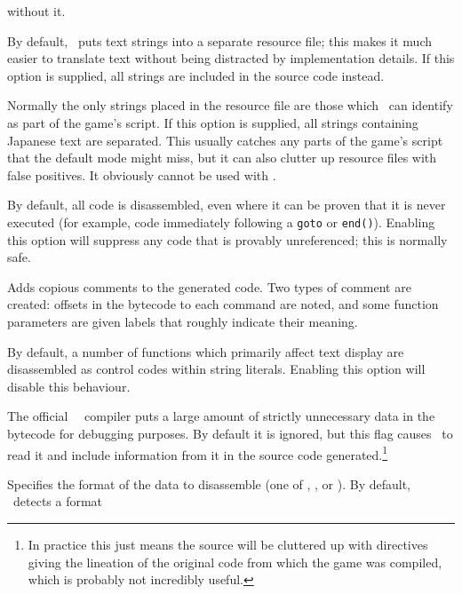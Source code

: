 \begin{nicelist}
\begin{extraopts}
      without it.
    \item[\clboth{s}{single-file}]
      By default, \archiver\ puts text strings into a separate resource file; this
      makes it much easier to translate text without being distracted by
      implementation details.  If this option is supplied, all strings are
      included in the source code instead.
    \item[\clboth{S}{separate-all}]
      Normally the only strings placed in the resource file are those which
      \archiver\ can identify as part of the game's script.  If this option is
      supplied, all strings containing Japanese text are separated.  This
      usually catches any parts of the game's script that the default mode might
      miss, but it can also clutter up resource files with false positives.  It
      obviously cannot be used with .
    \item[\clboth{u}{unreferenced}]
      By default, all code is disassembled, even where it can be proven that it
      is never executed (for example, code immediately following a
      \lstinline|goto| or \lstinline|end()|).  Enabling this option will
      suppress any code that is provably unreferenced; this is normally safe.
    \item[\clboth{n}{annotate}]
      Adds copious comments to the generated code.  Two types of comment are
      created: offsets in the bytecode to each command are noted, and some
      function parameters are given labels that roughly indicate their meaning.
    \item[\clboth{r}{no-codes}]
      By default, a number of functions which primarily affect text display are
      disassembled as control codes within string literals.  Enabling this
      option will disable this behaviour.
    \item[\clboth{g}{debug-info}]
      The official \vas\ \reallive\ compiler puts a large amount of strictly
      unnecessary data in the bytecode for debugging purposes.  By default it is
      ignored, but this flag causes \archiver\ to read it and include information
      from it in the source code generated.\footnote{In practice this just means
      the source will be cluttered up with  directives giving
      the lineation of the original code from which the game was compiled,
      which is probably not incredibly useful.}
    \item[\clbarg{t}{target}{TARGET}]
      Specifies the format of the data to disassemble (one of ,
      , or ).  By default, \disassembler\ detects a format

\end{extraopts}
\end{nicelist}
